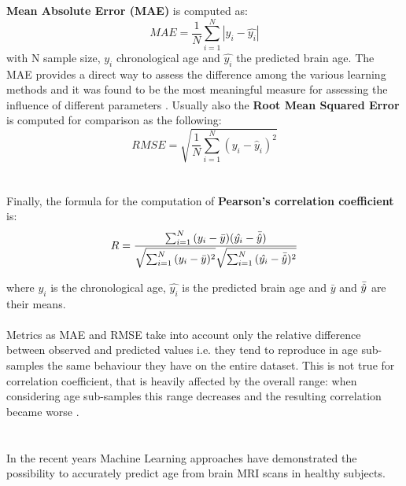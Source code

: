 \documentclass{article}
\begin{document}
	\textbf{Mean Absolute Error (MAE)} is computed as:
	\begin{equation}
		MAE = \frac{1}{N} \sum_{i = 1}^{N}{\left| y_i - \hat{y_i} \right|}
	\end{equation}
	with N sample size, $y_i$ chronological age and $\hat{y_i}$ the predicted brain age.
	The MAE provides a direct way to assess the difference among the various learning methods and it was found to be the most meaningful measure for assessing the influence of different parameters \cite{Franke2010}. Usually also the \textbf{Root Mean Squared Error} is computed for comparison as the following:
	\begin{equation}
		RMSE = \sqrt{\frac{1}{N} \sum_{i = 1}^{N}{(y_i - \hat{y}_i)^2}}
	\end{equation}
	\\
	\\
	Finally, the formula for the computation of \textbf{Pearson's correlation coefficient} is:
	\begin{equation}
		R = \frac{
			\sum_{i = 1}^{N}{(y_i - \bar{y}) (\hat{y_i} - \Bar{\hat{y}})}
		}
		{
			\sqrt{\sum_{i = 1}^{N}{(y_i - \bar{y})^2 }} \sqrt{\sum_{i = 1}^{N}{(\hat{y_i} - \Bar{\hat{y}})^2 }}
		}    
	\end{equation}
	
	where $y_i$ is the chronological age, $\hat{y_i}$ is the predicted brain age and $\bar{y}$ and $\Bar{\hat{y}}$ are their means.
	\\
	\\
	Metrics as MAE and RMSE take into account only the relative difference between observed and predicted values i.e. they tend to reproduce in age sub-samples the same behaviour they have on the entire dataset. This is not true for correlation coefficient, that is heavily affected by the overall range: when considering age sub-samples this range decreases and the resulting correlation became worse \cite{Amoroso2019}.
	\\
	\\
	\\
	In the recent years Machine Learning approaches have demonstrated the possibility to accurately predict age from brain MRI scans in healthy subjects.
	
\end{document}
